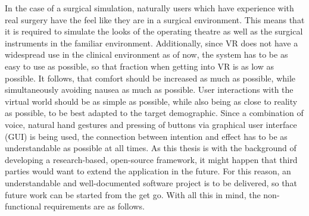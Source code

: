 In the case of a surgical simulation, naturally users which have experience with real surgery have the feel like they are in a surgical environment.
This means that it is required to simulate the looks of the operating theatre as well as the surgical instruments in the familiar environment.
Additionally, since VR does not have a widespread use in the clinical environment as of now, the system has to be as easy to use as possible, so that fraction when getting into VR is as low as possible.
It follows, that comfort should be increased as much as possible, while simultaneously avoiding nausea as much as possible.
User interactions with the virtual world should be as simple as possible, while also being as close to reality as possible, to be best adapted to the target demographic.
Since a combination of voice, natural hand gestures and pressing of buttons via graphical user interface (GUI) is being used, the connection between intention and effect has to be as understandable as possible at all times.
As this thesis is with the background of developing a research-based, open-source framework, it might happen that third parties would want to extend the application in the future.
For this reason, an understandable and well-documented software project is to be delivered, so that future work can be started from the get go.
With all this in mind, the non-functional requirements are as follows.


